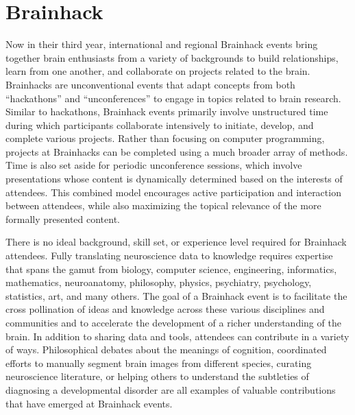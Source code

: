 \documentclass[11pt]{bmc_article_s50}
\begin{document}
\section{Brainhack}\label{brainhack}

Now in their third year, international and regional Brainhack events bring together brain enthusiasts from a variety of backgrounds to build relationships, learn from one another, and collaborate on projects related to the brain. Brainhacks are unconventional events that adapt concepts from both ``hackathons'' and ``unconferences'' to engage in topics related to brain research. Similar to hackathons, Brainhack events primarily involve unstructured time during which participants collaborate intensively to initiate, develop, and complete various projects. Rather than focusing on computer programming, projects at Brainhacks can be completed using a much broader array of methods. Time is also set aside for periodic unconference sessions, which involve presentations whose content is dynamically determined based on the interests of attendees. This combined model encourages active participation and interaction between attendees, while also maximizing the topical relevance of the more formally presented content.

There is no ideal background, skill set, or experience level required for Brainhack attendees. Fully translating neuroscience data to knowledge requires expertise that spans the gamut from biology, computer science, engineering, informatics, mathematics, neuroanatomy, philosophy, physics, psychiatry, psychology, statistics, art, and many others. The goal of a Brainhack event is to facilitate the cross pollination of ideas and knowledge across these various disciplines and communities and to accelerate the development of a richer understanding of the brain. In addition to sharing data and tools, attendees can contribute in a variety of ways. Philosophical debates about the meanings of cognition, coordinated efforts to manually segment brain images from different species, curating neuroscience literature, or helping others to understand the subtleties of diagnosing a developmental disorder are all examples of valuable contributions that have emerged at Brainhack events.
\end{document}
